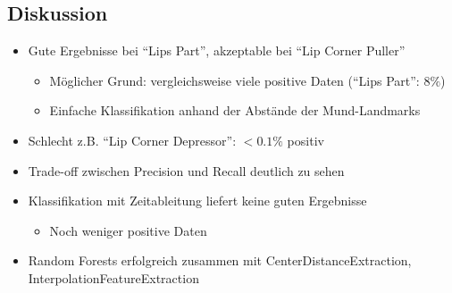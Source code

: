 \documentclass{beamer}
\begin{document}
\subsection{Diskussion}
\begin{frame}
  \begin{itemize}
    \item Gute Ergebnisse bei ``Lips Part'', akzeptable bei ``Lip Corner Puller''
      \begin{itemize}
        \item Möglicher Grund: vergleichsweise viele positive Daten (``Lips
          Part'': $8\%$)
        \item Einfache Klassifikation anhand der Abstände der Mund-Landmarks
      \end{itemize}
    \item Schlecht z.B. ``Lip Corner Depressor'': $<0.1\%$ positiv
  \end{itemize}
\end{frame}

\begin{frame}
  \begin{itemize}
    \item Trade-off zwischen Precision und Recall deutlich zu sehen
    \item Klassifikation mit Zeitableitung liefert keine guten Ergebnisse
      \begin{itemize}
        \item Noch weniger positive Daten
      \end{itemize}
    \item Random Forests erfolgreich zusammen mit CenterDistanceExtraction, InterpolationFeatureExtraction
  \end{itemize}
\end{frame}
\end{document}
